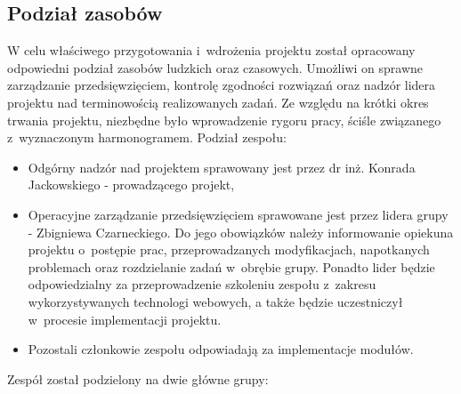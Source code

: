 \subsection{Podział zasobów}

W celu właściwego przygotowania i~wdrożenia projektu został opracowany odpowiedni podział zasobów ludzkich oraz czasowych. Umożliwi on sprawne zarządzanie przedsięwzięciem, kontrolę zgodności rozwiązań oraz nadzór lidera projektu nad terminowością realizowanych zadań. Ze względu na krótki okres trwania projektu, niezbędne było wprowadzenie rygoru pracy, ściśle związanego z~wyznaczonym harmonogramem. Podział zespołu:

\begin{itemize}
	\item Odgórny nadzór nad projektem sprawowany jest przez dr inż. Konrada Jackowskiego - prowadzącego projekt,
	\item Operacyjne zarządzanie przedsięwzięciem sprawowane jest przez lidera grupy - Zbigniewa Czarneckiego. Do jego obowiązków należy informowanie opiekuna projektu o~postępie prac, przeprowadzanych modyfikacjach, napotkanych problemach oraz rozdzielanie zadań w~obrębie grupy. Ponadto lider będzie odpowiedzialny za przeprowadzenie szkoleniu zespołu z~zakresu wykorzystywanych technologi webowych, a także będzie uczestniczył w~procesie implementacji projektu.
	\item Pozostali członkowie zespołu odpowiadają za implementacje modułów.
\end{itemize}
Zespół został podzielony na dwie główne grupy:
